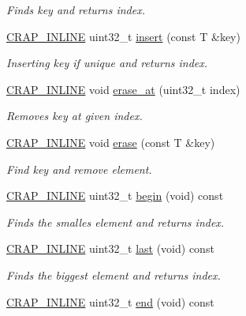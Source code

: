 \begin{DoxyCompactItemize}
\begin{DoxyCompactList}\small\item\em Finds key and returns index. \end{DoxyCompactList}\item 
\hyperlink{config__x86_8h_a5a40526b8d842e7ff731509998bb0f1c}{C\+R\+A\+P\+\_\+\+I\+N\+L\+I\+N\+E} uint32\+\_\+t \hyperlink{classcrap_1_1tree_a77e77b440e851db51154b6226f4a5f6a}{insert} (const T \&key)
\begin{DoxyCompactList}\small\item\em Inserting key if unique and returns index. \end{DoxyCompactList}\item 
\hyperlink{config__x86_8h_a5a40526b8d842e7ff731509998bb0f1c}{C\+R\+A\+P\+\_\+\+I\+N\+L\+I\+N\+E} void \hyperlink{classcrap_1_1tree_abfb24a2b155fa5e2715bc73abc1cc295}{erase\+\_\+at} (uint32\+\_\+t index)
\begin{DoxyCompactList}\small\item\em Removes key at given index. \end{DoxyCompactList}\item 
\hyperlink{config__x86_8h_a5a40526b8d842e7ff731509998bb0f1c}{C\+R\+A\+P\+\_\+\+I\+N\+L\+I\+N\+E} void \hyperlink{classcrap_1_1tree_ab670fe7f278039a408cbe5d54cbeaaa6}{erase} (const T \&key)
\begin{DoxyCompactList}\small\item\em Find key and remove element. \end{DoxyCompactList}\item 
\hyperlink{config__x86_8h_a5a40526b8d842e7ff731509998bb0f1c}{C\+R\+A\+P\+\_\+\+I\+N\+L\+I\+N\+E} uint32\+\_\+t \hyperlink{classcrap_1_1tree_aaa6d5af3d6d87bf8be050d33898c6ee4}{begin} (void) const 
\begin{DoxyCompactList}\small\item\em Finds the smalles element and returns index. \end{DoxyCompactList}\item 
\hyperlink{config__x86_8h_a5a40526b8d842e7ff731509998bb0f1c}{C\+R\+A\+P\+\_\+\+I\+N\+L\+I\+N\+E} uint32\+\_\+t \hyperlink{classcrap_1_1tree_aa6874d39e991dfb43c095daa5937a2e4}{last} (void) const 
\begin{DoxyCompactList}\small\item\em Finds the biggest element and returns index. \end{DoxyCompactList}\item 
\hyperlink{config__x86_8h_a5a40526b8d842e7ff731509998bb0f1c}{C\+R\+A\+P\+\_\+\+I\+N\+L\+I\+N\+E} uint32\+\_\+t \hyperlink{classcrap_1_1tree_a9e18d90e547fe2c07a4625ccfb8cbd4d}{end} (void) const 

\end{DoxyCompactItemize}
